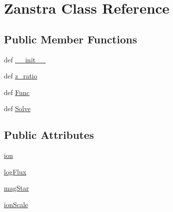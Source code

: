 \hypertarget{classpyneb_1_1utils_1_1stellar_1_1_zanstra}{\section{Zanstra Class Reference}
\label{classpyneb_1_1utils_1_1stellar_1_1_zanstra}
}
\subsection*{Public Member Functions}
\begin{DoxyCompactItemize}
\item 
def \hyperlink{classpyneb_1_1utils_1_1stellar_1_1_zanstra_ac775ee34451fdfa742b318538164070e}{\-\_\-\-\_\-init\-\_\-\-\_\-}
\item 
def \hyperlink{classpyneb_1_1utils_1_1stellar_1_1_zanstra_af24b90863b4fec6aaeb90b3b174eb272}{z\-\_\-ratio}
\item 
def \hyperlink{classpyneb_1_1utils_1_1stellar_1_1_zanstra_a60cd1baf76eff0d59121d4538fe0d904}{Func}
\item 
def \hyperlink{classpyneb_1_1utils_1_1stellar_1_1_zanstra_a0537944d0f2118e0b5ea82ee4db8b9c4}{Solve}
\end{DoxyCompactItemize}
\subsection*{Public Attributes}
\begin{DoxyCompactItemize}
\item 
\hyperlink{classpyneb_1_1utils_1_1stellar_1_1_zanstra_a1b13bcbedf5b7f9310ec3fba076e96e0}{ion}
\item 
\hyperlink{classpyneb_1_1utils_1_1stellar_1_1_zanstra_a00ccd651b0e342ae97ae41c8731045c1}{log\-Flux}
\item 
\hyperlink{classpyneb_1_1utils_1_1stellar_1_1_zanstra_a2517649f439ba0ed4c760c990a24821c}{mag\-Star}
\item 
\hyperlink{classpyneb_1_1utils_1_1stellar_1_1_zanstra_a9449c65bcffb0422723533ecc27054ae}{ion\-Scale}
\end{DoxyCompactItemize}


